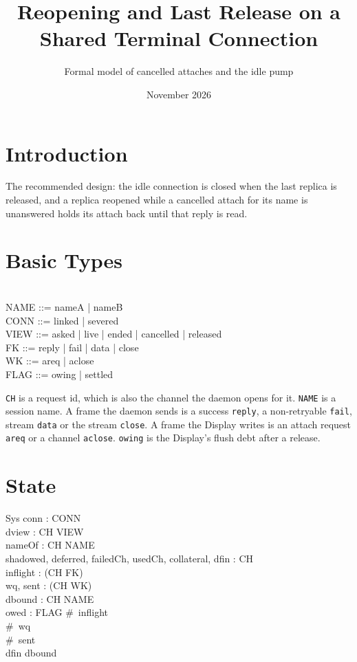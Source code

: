 \documentclass[a4paper,10pt,fleqn]{article}
\begin{document}


\title{Reopening and Last Release on a Shared Terminal Connection}
\author{Formal model of cancelled attaches and the idle pump}
\date{November 2026}
\maketitle

\section{Introduction}

The recommended design: the idle connection is closed when the last replica is released, and a replica reopened while a cancelled attach for its name is unanswered holds its attach back until that reply is read.

\section{Basic Types}

\begin{zed}
  [CH] \\
  NAME ::= nameA | nameB \\
  CONN ::= linked | severed \\
  VIEW ::= asked | live | ended | cancelled | released \\
  FK ::= reply | fail | data | close \\
  WK ::= areq | aclose \\
  FLAG ::= owing | settled
\end{zed}

\texttt{CH} is a request id, which is also the channel the daemon opens for
it.  \texttt{NAME} is a session name.  A frame the daemon sends is a
success \texttt{reply}, a non-retryable \texttt{fail}, stream \texttt{data}
or the stream \texttt{close}.  A frame the Display writes is an attach
request \texttt{areq} or a channel \texttt{aclose}.  \texttt{owing} is the
Display's flush debt after a release.

\section{State}

\begin{schema}{Sys}
  conn : CONN \\
  dview : CH \pfun VIEW \\
  nameOf : CH \pfun NAME \\
  shadowed, deferred, failedCh, usedCh, collateral, dfin : \power CH \\
  inflight : \seq (CH \cross FK) \\
  wq, sent : \seq (CH \cross WK) \\
  dbound : CH \pfun NAME \\
  owed : FLAG
\where
  \#~inflight  \\
  \#~wq  \\
  \#~sent  \\
  dfin \subseteq \dom dbound
\end{schema}
\end{document}

